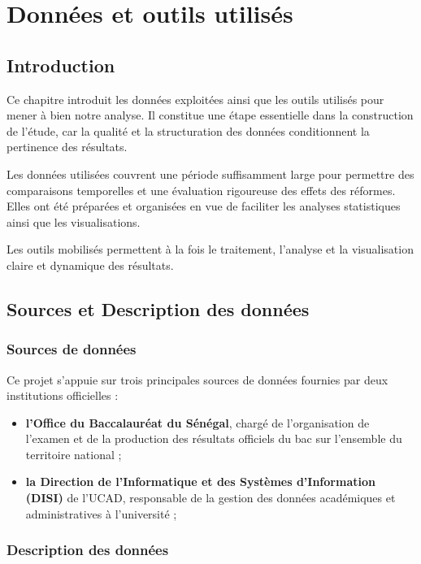 \chapter{Données et outils utilisés}

\section{Introduction}

Ce chapitre introduit les données exploitées ainsi que les outils utilisés pour mener à bien notre analyse. 
Il constitue une étape essentielle dans la construction de l’étude, car la qualité et la structuration des données conditionnent la pertinence des résultats.

Les données utilisées couvrent une période suffisamment large pour permettre des comparaisons temporelles et une évaluation rigoureuse des effets des réformes. 
Elles ont été préparées et organisées en vue de faciliter les analyses statistiques ainsi que les visualisations.

Les outils mobilisés permettent à la fois le traitement, l’analyse et la visualisation claire et dynamique des résultats. 

\section{Sources et Description des données}

\subsection{Sources de données}

Ce projet s’appuie sur trois principales sources de données fournies par deux institutions officielles : 
\begin{itemize}
    \item \textbf{l’Office du Baccalauréat du Sénégal}, chargé de l’organisation de l’examen et de la production des résultats officiels du bac sur l’ensemble du territoire national ;
    \item \textbf{la Direction de l’Informatique et des Systèmes d’Information (DISI)} de l’UCAD, responsable de la gestion des données académiques et administratives à l’université ;
\end{itemize}

\subsection{Description des données}


